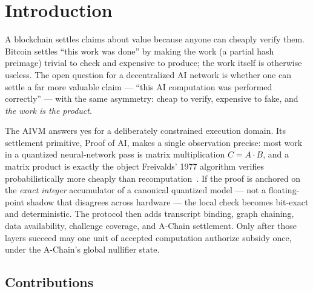\documentclass[11pt,a4paper]{article}
\begin{document}
\section{Introduction}

A blockchain settles claims about value because anyone can cheaply verify them. Bitcoin settles ``this work was done'' by making the work (a partial hash preimage) trivial to check and expensive to produce; the work itself is otherwise useless. The open question for a decentralized AI network is whether one can settle a far more valuable claim --- ``this AI computation was performed correctly'' --- with the same asymmetry: cheap to verify, expensive to fake, and \emph{the work is the product}.

The AIVM answers yes for a deliberately constrained execution domain. Its settlement primitive, Proof of AI, makes a single observation precise: most work in a quantized neural-network pass is matrix multiplication $C = A \cdot B$, and a matrix product is exactly the object Freivalds' 1977 algorithm verifies probabilistically more cheaply than recomputation~\cite{freivalds}. If the proof is anchored on the \emph{exact integer} accumulator of a canonical quantized model --- not a floating-point shadow that disagrees across hardware --- the local check becomes bit-exact and deterministic. The protocol then adds transcript binding, graph chaining, data availability, challenge coverage, and A-Chain settlement. Only after those layers succeed may one unit of accepted computation authorize subsidy once, under the A-Chain's global nullifier state.

\subsection{Contributions}
\end{document}
